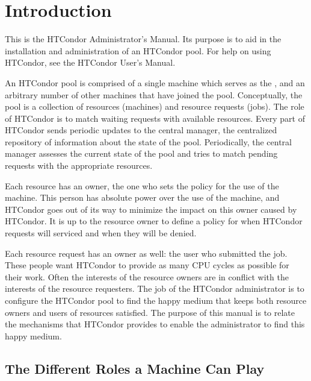 \section{\label{sec:Admin-Intro}Introduction}

This is the HTCondor Administrator's Manual.
Its purpose is to aid in
the installation and administration of an HTCondor pool.  For help on
using HTCondor, see the HTCondor User's Manual.  

An HTCondor pool
is comprised of a single machine which serves as the
,
and an arbitrary number of other machines that
have joined the pool.  Conceptually, the pool is a collection of
resources (machines) and resource requests (jobs).  The role of HTCondor
is to match waiting requests with available resources.  Every part of
HTCondor sends periodic updates to the central manager, the centralized
repository of information about the state of the pool.  Periodically,
the central manager assesses the current state of the pool and tries
to match pending requests with the appropriate resources.  

Each resource has an owner,
the one who sets the policy for the use of the machine.  This
person has absolute power over the use of the machine,
and HTCondor goes out
of its way to minimize the impact on this owner caused by HTCondor.  It
is up to the resource owner to define a policy for when HTCondor
requests will
serviced and when they will be denied.

Each resource request has an owner as well: the
user who submitted the job.  These people want HTCondor to provide as
many CPU cycles as possible for their work.  Often the interests of
the resource owners are in conflict with the interests of the resource
requesters.  
The job of the HTCondor administrator is to configure the HTCondor pool to
find the happy medium that keeps both resource owners and users of
resources satisfied.  The purpose of this manual is to relate
the mechanisms that HTCondor provides to enable the administrator to find
this happy medium.

\subsection{\label{sec:Machine-Roles}The Different Roles a Machine Can Play}

